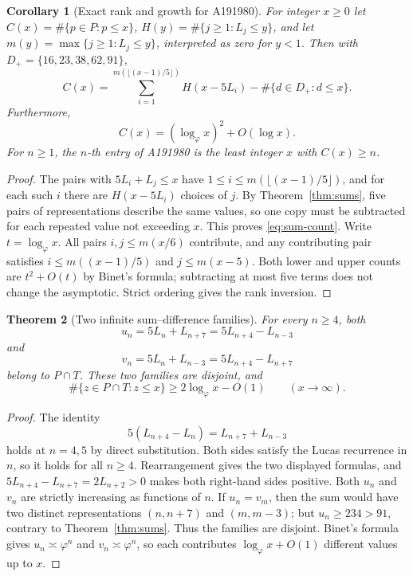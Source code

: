 \documentclass[11pt]{article}
\newtheorem{theorem}{Theorem}
\newtheorem{corollary}[theorem]{Corollary}
\begin{document}
\begin{corollary}[Exact rank and growth for A191980]\label{cor:sum-rank}
For integer $x\ge0$ let $C(x)=\#\{p\in P:p\le x\}$,
$H(y)=\#\{j\ge1:L_j\le y\}$, and let
$m(y)=\max\{j\ge1:L_j\le y\}$, interpreted as zero for $y<1$.
Then with $D_+=\{16,23,38,62,91\}$,
\begin{equation}\label{eq:sum-count}
\boxed{\displaystyle
C(x)=\sum_{i=1}^{m(\lfloor(x-1)/5\rfloor)}
   H(x-5L_i)-\#\{d\in D_+:d\le x\}.}
\end{equation}
Furthermore,
\[
C(x)=(\log_\varphi x)^2+O(\log x).
\]
For $n\ge1$, the $n$-th entry of A191980 is the
least integer $x$ with $C(x)\ge n$.
\end{corollary}
\begin{proof}
The pairs with $5L_i+L_j\le x$ have
$1\le i\le m(\lfloor(x-1)/5\rfloor)$,
and for each such $i$ there are $H(x-5L_i)$
choices of $j$. By Theorem~\ref{thm:sums}, five
pairs of representations describe the same values,
so one copy must be subtracted for each repeated value
not exceeding $x$. This proves \eqref{eq:sum-count}.
Write $t=\log_\varphi x$. All pairs
$i,j\le m(x/6)$ contribute, and any contributing pair
satisfies $i\le m((x-1)/5)$ and $j\le m(x-5)$.
Both lower and upper counts are $t^2+O(t)$ by
Binet's formula; subtracting at most five terms
does not change the asymptotic. Strict ordering
gives the rank inversion.
\end{proof}

\begin{theorem}[Two infinite sum--difference families]\label{thm:sum-overlap}
For every $n\ge4$, both
\[
u_n=5L_n+L_{n+7}=5L_{n+4}-L_{n-3}
\]
and
\[
v_n=5L_n+L_{n-3}=5L_{n+4}-L_{n+7}
\]
belong to $P\cap T$. These two families are disjoint, and
\[
\#\{z\in P\cap T:z\le x\}\ge 2\log_\varphi x-O(1)
\qquad(x\to\infty).
\]
\end{theorem}
\begin{proof}
The identity
\[
5(L_{n+4}-L_n)=L_{n+7}+L_{n-3}
\]
holds at $n=4,5$ by direct substitution.
Both sides satisfy the Lucas recurrence in $n$,
so it holds for all $n\ge4$. Rearrangement gives
the two displayed formulas, and
$5L_{n+4}-L_{n+7}=2L_{n+2}>0$
makes both right-hand sides positive.
Both $u_n$ and $v_n$ are strictly increasing as functions
of $n$. If $u_n=v_m$, then the sum would have two distinct
representations $(n,n+7)$ and $(m,m-3)$; but $u_n\ge234>91$,
contrary to Theorem~\ref{thm:sums}.
Thus the families are disjoint. Binet's formula gives
$u_n\asymp\varphi^n$ and $v_n\asymp\varphi^n$,
so each contributes $\log_\varphi x+O(1)$ different
values up to $x$.
\end{proof}
\end{document}
